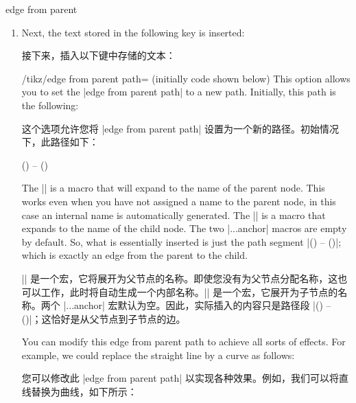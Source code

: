 \begin{pathoperation}{edge from parent}{}
\begin{enumerate}
        然后，执行 。


        \item Next, the text stored in the following key is inserted:
            
        接下来，插入以下键中存储的文本：


            \begin{key}{/tikz/edge from parent path= (initially \normalfont code shown below)}
                This option allows you to set the |edge from parent path| to a
                new path. Initially, this path is the following:
                
                这个选项允许您将 |edge from parent path| 设置为一个新的路径。初始情况下，此路径如下：


\begin{codeexample}
(\tikzparentnode\tikzparentanchor) -- (\tikzchildnode\tikzchildanchor)
\end{codeexample}
                
                The |\tikzparentnode| is a macro that will expand to the name
                of the parent node. This works even when you have not assigned
                a name to the parent node, in this case an internal name is
                automatically generated. The |\tikzchildnode| is a macro that
                expands to the name of the child node. The two |...anchor|
                macros are empty by default. So, what is essentially inserted
                is just the path segment
                |(\tikzparentnode) -- (\tikzchildnode)|; which is exactly an
                edge from the parent to the child.

                |\tikzparentnode| 是一个宏，它将展开为父节点的名称。即使您没有为父节点分配名称，这也可以工作，此时将自动生成一个内部名称。|\tikzchildnode| 是一个宏，它展开为子节点的名称。两个 |...anchor| 宏默认为空。因此，实际插入的内容只是路径段 |(\tikzparentnode) -- (\tikzchildnode)|；这恰好是从父节点到子节点的边。

                You can modify this edge from parent path to achieve all sorts
                of effects. For example, we could replace the straight line by
                a curve as follows:

                您可以修改此 |edge from parent path| 以实现各种效果。例如，我们可以将直线替换为曲线，如下所示：


\begin{codeexample}[]
\end{codeexample}


\end{key}
\end{enumerate}
\end{pathoperation}
